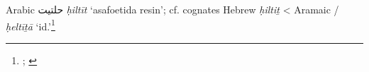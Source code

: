 \begin{etymology}\label{ety:hiltit}
Arabic {حلتيت} \textit{ḥiltīt} `asafoetida resin'; cf. cognates Hebrew  \textit{ḥiltiṯ}
< Aramaic {/} \textit{ḥeltīṯā} `id.'\footnote{\textcite[140]{fraenkel_aramaischen_1886}; \textcites[36]{low_aramaeische_1881}[Vol. 3, p. 452-455]{low_flora_1924}}
\end{etymology}
